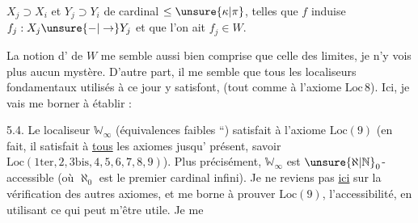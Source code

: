 $X_j\supset X_i$ et $Y_j\supset Y_i$ de cardinal $\leq\unsure{\kappa|\pi}$, telles que $f$ induise $f_j:X_j\unsure{\mathbin{-}|\to}Y_j$ et que l'on ait $f_j\in W$.

La notion d' de $W$ me semble aussi bien comprise que celle des limites, je n'y vois plus aucun mystère. D'autre part, il me semble que tous les localiseurs fondamentaux utilisés à ce jour y satisfont, (tout comme à l'axiome $\mathrm{Loc}\,8$).  Ici, je vais me borner à établir :

\uline{}  5.4. Le localiseur  $\mathbb W_\infty$ (équivalences faibles ``) satisfait à l'axiome $\mathrm{Loc}(9)$ (en fait, il satisfait à \uline{tous} les axiomes  jusqu' présent, savoir $\mathrm{Loc}(1\mathrm{ter},2,3\mathrm{bis},4,5,6,7,8,9)$).
Plus précisément, $\mathbb W_\infty$ est $\unsure{\aleph|\mathbb N}_0$-accessible (où $\aleph_0$ est le premier cardinal infini).
Je ne reviens pas \uline{ici} sur la vérification des autres axiomes, et me borne à prouver $\mathrm{Loc}(9)$, l'accessibilité, en utilisant ce qui peut m'être utile. Je me
